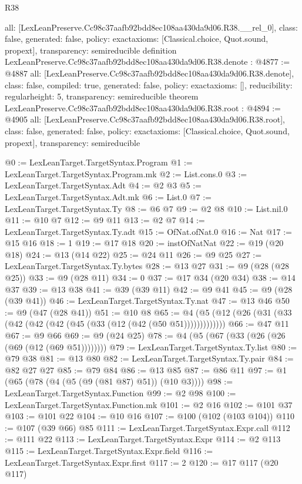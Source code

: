 \begin{lexlean}{R38}
\begin{coremodule}
{  all: [LexLeanPreserve.Cc98c37aafb92bdd8ec108aa430da9d06.R38.__rel_0],
  class: false,
  generated: false,
  policy: exact{axioms: [Classical.choice, Quot.sound, propext]},
  transparency: semireducible
}
definition LexLeanPreserve.Cc98c37aafb92bdd8ec108aa430da9d06.R38.denote : @4877 := @4887 {
  all: [LexLeanPreserve.Cc98c37aafb92bdd8ec108aa430da9d06.R38.denote],
  class: false,
  compiled: true,
  generated: false,
  policy: exact{axioms: []},
  reducibility: regular{height: 5},
  transparency: semireducible
}
theorem LexLeanPreserve.Cc98c37aafb92bdd8ec108aa430da9d06.R38.root : @4894 := @4905 {
  all: [LexLeanPreserve.Cc98c37aafb92bdd8ec108aa430da9d06.R38.root],
  class: false,
  generated: false,
  policy: exact{axioms: [Classical.choice, Quot.sound, propext]},
  transparency: semireducible
}

@0 := LexLeanTarget.TargetSyntax.Program
@1 := LexLeanTarget.TargetSyntax.Program.mk
@2 := List.cons.{0}
@3 := LexLeanTarget.TargetSyntax.Adt
@4 := @2 @3
@5 := LexLeanTarget.TargetSyntax.Adt.mk
@6 := List.{0}
@7 := LexLeanTarget.TargetSyntax.Ty
@8 := @6 @7
@9 := @2 @8
@10 := List.nil.{0}
@11 := @10 @7
@12 := @9 @11
@13 := @2 @7
@14 := LexLeanTarget.TargetSyntax.Ty.adt
@15 := OfNat.ofNat.{0}
@16 := Nat
@17 := @15 @16
@18 := 1
@19 := @17 @18
@20 := instOfNatNat
@22 := @19 (@20 @18)
@24 := @13 (@14 @22)
@25 := @24 @11
@26 := @9 @25
@27 := LexLeanTarget.TargetSyntax.Ty.bytes
@28 := @13 @27
@31 := @9 (@28 (@28 @25))
@33 := @9 (@28 @11)
@34 := 0
@37 := @17 @34 (@20 @34)
@38 := @14 @37
@39 := @13 @38
@41 := @39 (@39 @11)
@42 := @9 @41
@45 := @9 (@28 (@39 @41))
@46 := LexLeanTarget.TargetSyntax.Ty.nat
@47 := @13 @46
@50 := @9 (@47 (@28 @41))
@51 := @10 @8
@65 := @4 (@5 (@12 (@26 (@31 (@33 (@42 (@42 (@42 (@45 (@33 (@12 (@42 (@50 @51)))))))))))))
@66 := @47 @11
@67 := @9 @66
@69 := @9 (@24 @25)
@78 := @4 (@5 (@67 (@33 (@26 (@26 (@69 (@12 (@69 @51))))))))
@79 := LexLeanTarget.TargetSyntax.Ty.list
@80 := @79 @38
@81 := @13 @80
@82 := LexLeanTarget.TargetSyntax.Ty.pair
@84 := @82 @27 @27
@85 := @79 @84
@86 := @13 @85
@87 := @86 @11
@97 := @1 (@65 (@78 (@4 (@5 (@9 (@81 @87) @51)) (@10 @3))))
@98 := LexLeanTarget.TargetSyntax.Function
@99 := @2 @98
@100 := LexLeanTarget.TargetSyntax.Function.mk
@101 := @2 @16
@102 := @101 @37
@103 := @101 @22
@104 := @10 @16
@107 := @100 (@102 (@103 @104))
@110 := @107 (@39 @66) @85
@111 := LexLeanTarget.TargetSyntax.Expr.call
@112 := @111 @22
@113 := LexLeanTarget.TargetSyntax.Expr
@114 := @2 @113
@115 := LexLeanTarget.TargetSyntax.Expr.field
@116 := LexLeanTarget.TargetSyntax.Expr.first
@117 := 2
@120 := @17 @117 (@20 @117)

\end{coremodule}
\end{lexlean}
